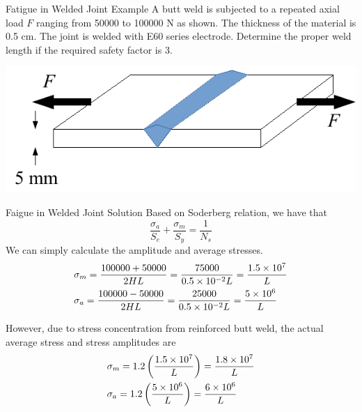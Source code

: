 \documentclass[10pt, svgnames]{beamer}
\begin{document}
\begin{frame}[label={sec:org23615cf}]{Fatigue in Welded Joint Example}
A butt weld is subjected to a repeated axial load \(F\) ranging from 50000 to 100000 N as shown. The thickness of the material is 0.5 cm. The joint is welded with E60 series electrode. Determine the proper weld length if the required safety factor is 3.

\begin{center}
  \includegraphics[scale=0.7]{pictures/fatigue-weld-analysis-example}
\end{center}
\end{frame}

\begin{frame}[label={sec:org544ecaf}]{Faigue in Welded Joint Solution}
Based on Soderberg relation, we have that
\[\frac{\sigma _a}{S_e} + \frac{\sigma _m}{S_y} = \frac{1}{N_s}\]
We can simply calculate the amplitude and average stresses.
\[\begin{gathered}
      \sigma _m = \frac{100000 + 50000}{2HL} = \frac{75000}{0.5 \times 10^{ - 2}L} = \frac{1.5 \times 10^7}{L} \hfill \\
      \sigma _a = \frac{100000 - 50000}{2HL} = \frac{25000}{0.5 \times 10^{ - 2}L} = \frac{5 \times 10^6}{L} \hfill \\ 
    \end{gathered} \]
\end{frame}

\begin{frame}[label={sec:orgd25fa70}]{}
  However, due to stress concentration from reinforced butt weld, the actual average stress and stress amplitudes are
\[\begin{gathered}
      {\sigma _m} = 1.2\left( {\frac{{1.5 \times {{10}^7}}}{L}} \right) = \frac{{1.8 \times {{10}^7}}}{L} \hfill \\
      {\sigma _a} = 1.2\left( {\frac{{5 \times {{10}^6}}}{L}} \right) = \frac{{6 \times {{10}^6}}}{L} \hfill \\ 
    \end{gathered} \]
\end{frame}
\end{document}
